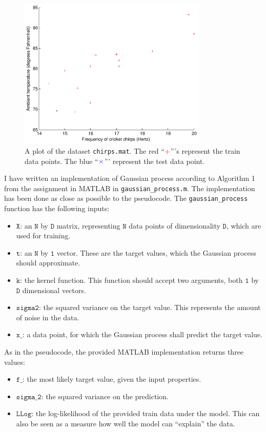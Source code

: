 \documentclass[a4paper,11pt]{article}
\newcommand{\T}[1]{\ensuremath{\mathtt{#1}}}
\begin{document}
\begin{figure}
  \begin{center}
  \caption{A plot of the dataset \texttt{chirps.mat}.  The red ``$\color{red}+$'''s represent the train data points. The blue ``$\color{blue}\times$''' represent the test data point.}
    \label{fig:ex2plot1}
    \includegraphics[width=0.8\textwidth]{ex2plot1}
  \end{center}
\end{figure}


I have written an implementation of Gaussian process according to Algorithm 1 from the assignment in MATLAB in \texttt{gaussian\_process.m}.  The implementation has been done as close as possible to the pseudocode.  The \texttt{gaussian\_process} function has the following inputs:
\begin{itemize}
\item $\T{X}$: an $\T{N}$ by $\T{D}$ matrix, representing $\T{N}$ data points of dimensionality $\T{D}$, which are used for training.
\item $\T{t}$: an $\T{N}$ by $\T{1}$ vector.  These are the target values, which the Gaussian process should approximate.
\item $\T{k}$: the kernel function.  This function should accept two arguments, both $\T{1}$ by $\T{D}$ dimensional vectors.
\item $\T{sigma2}$: the squared variance on the target value.  This represents the amount of noise in the data.
\item $\T{x\_}$: a data point, for which the Gaussian process shall predict the target value.
\end{itemize}
As in the pseudocode, the provided MATLAB implementation returns three values:
\begin{itemize}
\item $\T{f\_}$: the most likely target value, given the input properties.
\item $\T{sigma\_2}$: the squared variance on the prediction.
\item $\T{LLog}$: the log-likelihood of the provided train data under the model.  This can also be seen as a measure how well the model can ``explain'' the data.
\end{itemize}  
\end{document}
